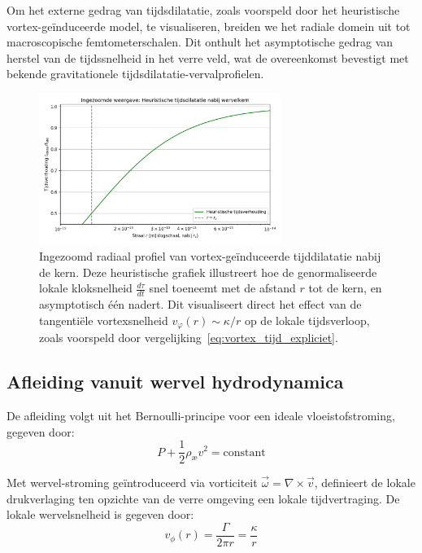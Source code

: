 Om het externe gedrag van tijdsdilatatie, zoals voorspeld door het heuristische vortex-geïnduceerde model, te visualiseren, breiden we het radiale domein uit tot macroscopische femtometerschalen. Dit onthult het asymptotische gedrag van herstel van de tijdssnelheid in het verre veld, wat de overeenkomst bevestigt met bekende gravitationele tijdsdilatatie-vervalprofielen.

\begin{figure}[H]
    \centering
    \includegraphics[width=0.7\textwidth]{images/06-HeuristicTimeDilation4_nl}
    \caption{
        Ingezoomd radiaal profiel van vortex-geïnduceerde tijddilatatie nabij de kern.
        Deze heuristische grafiek illustreert hoe de genormaliseerde lokale kloksnelheid
        $\frac{d\tau}{dt}$ snel toeneemt met de afstand $r$ tot de kern,
        en asymptotisch één nadert. Dit visualiseert direct het effect van
        de tangentiële vortexsnelheid $v_\varphi(r) \sim \kappa / r$ op de lokale tijdsverloop,
        zoals voorspeld door vergelijking~\eqref{eq:vortex_tijd_expliciet}.
    }
    \label{fig:HeuristicTimeDilation}
\end{figure}

\subsection{Afleiding vanuit wervel hydrodynamica}

De afleiding volgt uit het Bernoulli-principe voor een ideale vloeistofstroming, gegeven door:
\begin{equation}\label{eq:Bernoulli}
    P + \frac{1}{2}\rho_\text{\ae} v^2 = \text{constant}
\end{equation}

Met wervel-stroming geïntroduceerd via vorticiteit $\vec{\omega} = \nabla \times \vec{v}$, definieert de lokale drukverlaging ten opzichte van de verre omgeving een lokale tijdvertraging. De lokale wervelsnelheid is gegeven door:
\begin{equation}\label{eq:tangentiele_snelheid}
    v_{\phi}(r) = \frac{\Gamma}{2\pi r} = \frac{\kappa}{r}
\end{equation}

